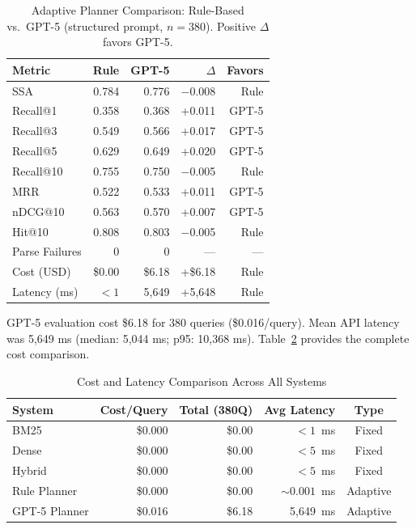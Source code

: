 \begin{table}[htbp]
\centering
\caption{Adaptive Planner Comparison: Rule-Based vs.\ GPT-5 (structured prompt, $n{=}380$). Positive $\Delta$ favors GPT-5.}
\label{tab:planner_comparison}
\begin{tabular}{lrrrr}
\toprule
\textbf{Metric} & \textbf{Rule} & \textbf{GPT-5} & $\Delta$ & \textbf{Favors} \\
\midrule
SSA             & 0.784 & 0.776 & $-$0.008 & Rule \\
Recall@1        & 0.358 & 0.368 & +0.011   & GPT-5 \\
Recall@3        & 0.549 & 0.566 & +0.017   & GPT-5 \\
Recall@5        & 0.629 & 0.649 & +0.020   & GPT-5 \\
Recall@10       & 0.755 & 0.750 & $-$0.005 & Rule \\
MRR             & 0.522 & 0.533 & +0.011   & GPT-5 \\
nDCG@10         & 0.563 & 0.570 & +0.007   & GPT-5 \\
Hit@10          & 0.808 & 0.803 & $-$0.005 & Rule \\
\midrule
Parse Failures  & 0     & 0     & ---      & --- \\
Cost (USD)      & \$0.00 & \$6.18 & +\$6.18 & Rule \\
Latency (ms)    & ${<}1$  & 5{,}649 & +5{,}648 & Rule \\
\bottomrule
\end{tabular}
\end{table}

GPT-5 evaluation cost \$6.18 for 380 queries (\$0.016/query). Mean API latency was 5,649 ms (median: 5,044 ms; p95: 10,368 ms). Table~\ref{tab:cost_latency} provides the complete cost comparison.

\begin{table}[htbp]
\centering
\caption{Cost and Latency Comparison Across All Systems}
\label{tab:cost_latency}
\begin{tabular}{lrrrc}
\toprule
\textbf{System} & \textbf{Cost/Query} & \textbf{Total (380Q)} & \textbf{Avg Latency} & \textbf{Type} \\
\midrule
BM25            & \$0.000 & \$0.00 & ${<}1$~ms & Fixed \\
Dense           & \$0.000 & \$0.00 & ${<}5$~ms & Fixed \\
Hybrid          & \$0.000 & \$0.00 & ${<}5$~ms & Fixed \\
Rule Planner    & \$0.000 & \$0.00 & ${\sim}0.001$~ms & Adaptive \\
GPT-5 Planner   & \$0.016 & \$6.18 & 5{,}649~ms & Adaptive \\
\bottomrule
\end{tabular}
\end{table}

